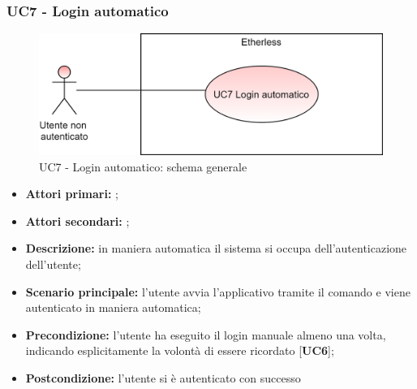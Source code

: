 \subsubsection{UC7 - Login automatico}
\begin{figure}[h]
	\centering
	\includegraphics[scale=\ucs]{./res/img/UC7G.png}
	\caption {UC7 - Login automatico: schema generale}
\end{figure}
\begin{itemize}
	\item \textbf{Attori primari:} \una{};
	\item \textbf{Attori secondari:} \re{};
	\item \textbf{Descrizione:} in maniera automatica il sistema si occupa dell’autenticazione dell’utente;
	\item \textbf{Scenario principale:} l’utente avvia l'applicativo tramite il comando \init{} e viene autenticato in maniera automatica; 
	\item \textbf{Precondizione:} l’utente ha eseguito il login manuale almeno una volta, indicando esplicitamente la volontà di essere ricordato [\textbf{UC6}];
	\item \textbf{Postcondizione:} l’utente si è autenticato con successo
\end{itemize}